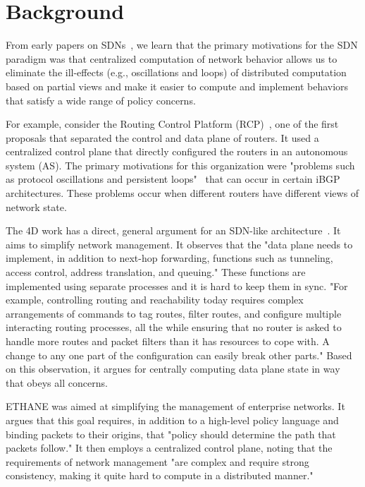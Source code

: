 \section{Background}
\label{sec:background}

From early papers on SDNs~\cite{rcp-case,rcp,4d,ethane}, we learn that the primary motivations for the SDN paradigm was that centralized computation of network behavior allows us to eliminate the ill-effects (e.g., oscillations and loops) of distributed computation based on partial views and make it easier to compute and implement behaviors that satisfy a wide range of policy concerns. 

For example, consider the Routing Control Platform (RCP)~\cite{rcp-case,rcp}, one of the first proposals that separated the control and data plane of routers. It used a centralized control plane that directly configured the routers in an autonomous system (AS). The primary motivations for this organization were "problems such as protocol oscillations and persistent loops"~\cite{rcp} that can occur in certain iBGP architectures. These problems occur when different routers have different views of network state.

The 4D work has a direct, general argument for an SDN-like architecture~\cite{4d}. It aims to simplify network management. It observes that the "data plane needs to implement, in addition to next-hop forwarding, functions such as tunneling, access control, address translation, and queuing." These functions are implemented using separate processes and it is hard to keep them in sync. "For example, controlling routing and reachability today requires complex arrangements of commands to tag routes, filter routes, and configure multiple interacting routing processes, all the while ensuring that no router is asked to handle more routes and packet filters than it has resources to cope with. A change to any one part of the configuration can easily break other parts." Based on this observation, it argues for centrally computing data plane state in way that obeys all concerns.

ETHANE was aimed at simplifying the management of enterprise networks. It argues that this goal requires, in addition to a high-level policy language and binding packets to their origins, that "policy should determine the path that packets follow." It then employs a centralized control plane, noting that the requirements of network management "are complex and require strong consistency, making it quite hard to compute in a distributed manner."

